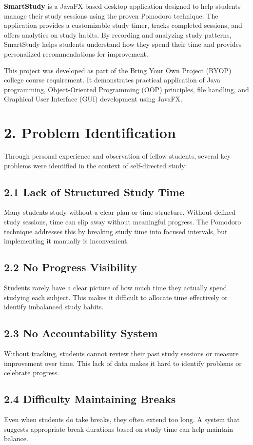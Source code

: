 \documentclass[12pt,a4paper]{article}
\begin{document}
\textbf{SmartStudy} is a JavaFX-based desktop application designed to help students manage their study sessions using the proven Pomodoro technique. The application provides a customizable study timer, tracks completed sessions, and offers analytics on study habits. By recording and analyzing study patterns, SmartStudy helps students understand how they spend their time and provides personalized recommendations for improvement.

This project was developed as part of the Bring Your Own Project (BYOP) college course requirement. It demonstrates practical application of Java programming, Object-Oriented Programming (OOP) principles, file handling, and Graphical User Interface (GUI) development using JavaFX.

\section{2. Problem Identification}

Through personal experience and observation of fellow students, several key problems were identified in the context of self-directed study:

\subsection{2.1 Lack of Structured Study Time}
Many students study without a clear plan or time structure. Without defined study sessions, time can slip away without meaningful progress. The Pomodoro technique addresses this by breaking study time into focused intervals, but implementing it manually is inconvenient.

\subsection{2.2 No Progress Visibility}
Students rarely have a clear picture of how much time they actually spend studying each subject. This makes it difficult to allocate time effectively or identify imbalanced study habits.

\subsection{2.3 No Accountability System}
Without tracking, students cannot review their past study sessions or measure improvement over time. This lack of data makes it hard to identify problems or celebrate progress.

\subsection{2.4 Difficulty Maintaining Breaks}
Even when students do take breaks, they often extend too long. A system that suggests appropriate break durations based on study time can help maintain balance.
\end{document}

